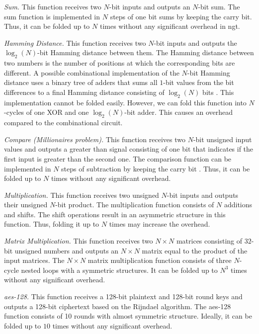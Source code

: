 \textit{Sum.} This function receives two $N$-bit inputs and outputs an $N$-bit sum.
The sum function is implemented in $N$ steps of one bit sums by keeping the carry bit.
Thus, it can be folded up to $N$ times without any significant overhead in \acrfull{ngt}.

\textit{Hamming Distance.} This function receives two $N$-bit inputs and outputs the $\log_2(N)$-bit Hamming distance between them.
The Hamming distance between two numbers is the number of positions at which the corresponding bits are different.
A possible combinational implementation of the $N$-bit Hamming distance uses a binary tree of adders that sums all $1$-bit values from the bit differences to a final Hamming distance consisting of $\log_2(N)$ bits \cite{boyar2006concrete}.
This implementation cannot be folded easily.
However, we can fold this function into $N$-cycles of one XOR and one $\log_2(N)$-bit adder.
This causes an overhead compared to the combinational circuit.

\textit{Compare (Millionaires problem).} This function receives two $N$-bit unsigned input values and outputs a greater than signal consisting of one bit that indicates if the first input is greater than the second one.
The comparison function can be implemented in $N$ steps of subtraction by keeping the carry bit \cite{kolesnikov2009improved}.
Thus, it can be folded up to $N$ times without any significant overhead.

\textit{Multiplication.} This function receives two unsigned $N$-bit inputs and outputs their unsigned $N$-bit product.
The multiplication function consists of $N$ additions and shifts.
The shift operations result in an asymmetric structure in this function.
Thus, folding it up to $N$ times may increase the overhead.

\textit{Matrix Multiplication.} This function receives two $N\times N$ matrices consisting of $32$-bit unsigned numbers and outputs an $N\times N$ matrix equal to the product of the input matrices.
The $N\times N$ matrix multiplication function consists of three $N$-cycle nested loops with a symmetric structures.
It can be folded up to $N^3$ times without any significant overhead.

\textit{\acrshort{aes}-128.} This function receives a 128-bit plaintext and 128-bit round keys and outputs a 128-bit ciphertext based on the Rijndael algorithm.
The \acrshort{aes}-128 function consists of 10 rounds with almost symmetric structure.
Ideally, it can be folded up to $10$ times without any significant overhead.

